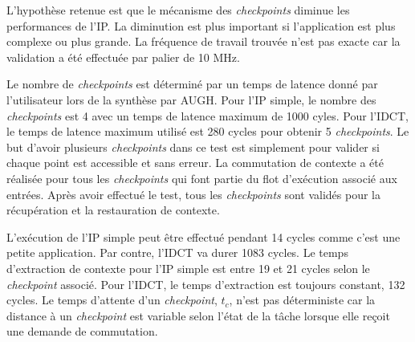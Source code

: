 L'hypothèse retenue est que le mécanisme des \emph{checkpoints} diminue les performances de l'IP. La diminution est plus important
si l'application est plus complexe ou plus grande. La fréquence de travail trouvée n'est pas exacte 
car la validation a été effectuée par palier de 10 MHz.

Le nombre de \emph{checkpoints} est déterminé par un temps de latence donné par l'utilisateur lors de la synthèse par AUGH. Pour l'IP simple,
le nombre des \emph{checkpoints} est 4 avec un temps de latence maximum de 1000 cyles. 
Pour l'IDCT, le temps de latence maximum utilisé est 280 cycles pour obtenir 5 \emph{checkpoints}.
Le but d'avoir plusieurs \emph{checkpoints} dans ce test est simplement pour valider si chaque point est accessible et sans erreur.
La commutation de contexte a été réalisée pour tous les \emph{checkpoints} qui font partie du flot d'exécution associé
aux entrées. Après avoir effectué le test, tous les \emph{checkpoints} sont validés pour la récupération et la restauration de contexte.

L'exécution de l'IP simple peut être effectué pendant 14 cycles comme c'est une petite application. Par contre, l'IDCT
va durer 1083 cycles. Le temps d'extraction de contexte pour l'IP simple est entre 19 et 21 cycles
selon le \emph{checkpoint} associé. Pour l'IDCT, le temps d'extraction est toujours constant, 132 cycles. Le temps d'attente
d'un \emph{checkpoint}, $t_c$, n'est pas déterministe car la distance à un \emph{checkpoint} est variable selon
l'état de la tâche lorsque elle reçoit une demande de commutation. 

